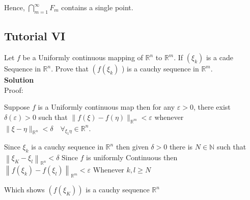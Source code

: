 \documentclass{article}
\begin{document}
Hence, $\bigcap_{m=1}^{\infty} F_{m}$ contains a single point.
\newpage
\subsection{Tutorial VI}
Let $f$ be a Uniformly continuous mapping of $\mathbb{R}^{n}$ to $\mathbb{R}^{m}$. If $\left(\xi_{k}\right)$ is a cade Sequence in $\mathbb{R}^{n}$. Prove that $\left(f\left(\xi_{k}\right)\right.$ ) is a cauchy sequence in $\mathbb{R}^{m}$.\\

\textbf{Solution}\\

Proof:

Suppose $f$ is a Uniformly continuous map then for any $\varepsilon>0$, 
there exist $\delta(\varepsilon)>0$ such that $\|f(\xi)-f(\eta)\|_{\mathbb{R}^{m}}<\varepsilon$ whenever $\|\xi-\eta\|_{\mathbb{R}^{n}}<\delta \quad \forall_{\xi_{1} \eta} \in \mathbb{R}^{n}$. 

Since $\xi_{k}$ is a cauchy sequence in $\mathbb{R}^{n}$ then given $\delta>0$ there is $N \in \mathbb{N}$ such that $\left\|\xi_{K}-\xi_{l}\right\|_{\mathbb{R}^{n}}<\delta$ Since $f$ is uniformly Continuous then $\left\|f\left(\xi_{k}\right)-f\left(\xi_{l}\right)\right\|_{\mathbb{R}^{m}}<\varepsilon$ Whenever $k, l \geq N$

Which shows $\left(f\left(\xi_{K}\right)\right)$ is a cauchy sequence $ \mathbb{R}^{n}$
\end{document}
